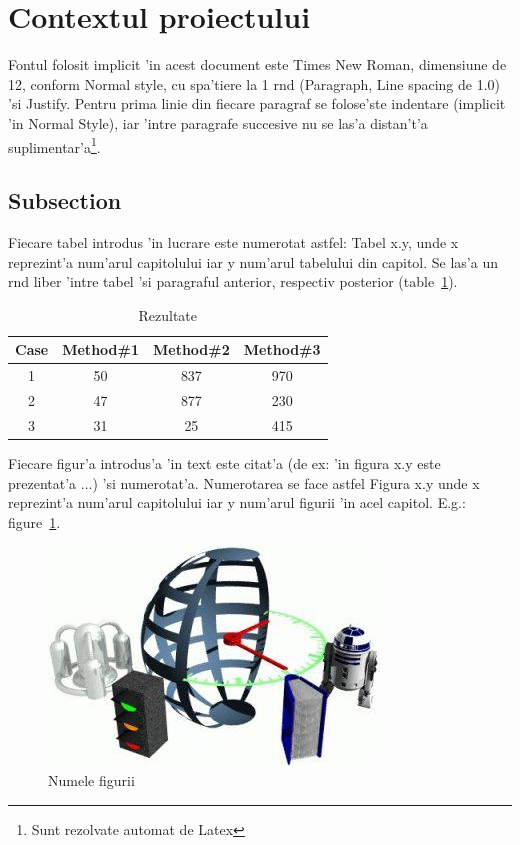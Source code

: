 \documentclass[12pt,a4paper,twoside]{report}
\begin{document}
\section{Contextul proiectului}

Fontul folosit implicit 'in acest document este Times New Roman, dimensiune de 12, conform Normal style, cu spa'tiere la 1 r\ia nd (Paragraph, Line spacing de 1.0) 'si Justify. 
Pentru prima linie din fiecare paragraf se folose'ste indentare (implicit 'in Normal Style), iar 'intre paragrafe succesive nu se las'a distan't'a suplimentar'a\footnote{Sunt rezolvate automat de Latex}.

\subsection{Subsection}
Fiecare tabel introdus 'in lucrare este numerotat astfel: Tabel x.y, unde x reprezint'a num'arul capitolului iar y num'arul tabelului din capitol. 
Se las'a un r\ia nd liber 'intre tabel 'si paragraful anterior, respectiv posterior (table~\ref{table:nonlin}).

\begin{table}[ht]
\caption{Rezultate}
\centering                          %
\begin{tabular}{|c|c|c|c|}          %
\hline\hline                        %
Case & Method\#1 & Method\#2 & Method\#3 \\ [0.5ex]   %
\hline                              %
1 & 50 & 837 & 970 \\               %
2 & 47 & 877 & 230 \\
3 & 31 & 25 & 415 \\[1ex]           %
\hline                              
\end{tabular}
\label{table:nonlin}                %
\end{table}

Fiecare figur'a introdus'a 'in text este citat'a (de ex: 'in figura x.y este prezentat'a ...) 'si numerotat'a. 
Numerotarea se face astfel Figura x.y unde x reprezint'a num'arul capitolului iar y num'arul figurii 'in acel capitol. 
E.g.: figure~\ref{fig:imag}.

\begin{figure}[ht]
    \centering
\includegraphics[]{img/test.jpg}
    \caption{Numele figurii}
    \label{fig:imag}
\end{figure}
\end{document}
